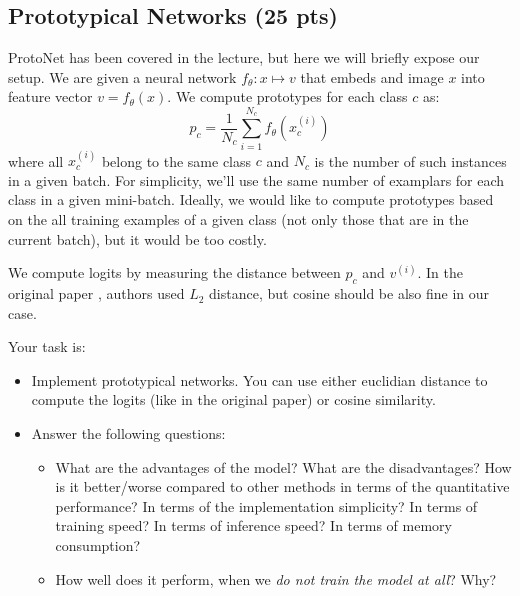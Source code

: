 \documentclass[letterpaper,12pt]{article}
\begin{document}
\subsection{Prototypical Networks (25 pts)}
ProtoNet has been covered in the lecture, but here we will briefly expose our setup.
We are given a neural network $f_\theta : x \mapsto v$ that embeds and image $x$ into feature vector $v = f_\theta(x)$.
We compute prototypes for each class $c$ as:
\begin{equation}
    p_c = \frac{1}{N_c} \sum_{i=1}^{N_c} f_\theta(x^{(i)}_c)
\end{equation}
where all $x^{(i)}_c$ belong to the same class $c$ and $N_c$ is the number of such instances in a given batch.
For simplicity, we'll use the same number of examplars for each class in a given mini-batch.
Ideally, we would like to compute prototypes based on the all training examples of a given class (not only those that are in the current batch), but it would be too costly.

We compute logits by measuring the distance between $p_c$ and $v^{(i)}$.
In the original paper \cite{ProtoNet}, authors used $L_2$ distance, but cosine should be also fine in our case.

Your task is:
\begin{itemize}
    \item Implement prototypical networks. You can use either euclidian distance to compute the logits (like in the original paper) or cosine similarity.
    \item Answer the following questions:
    \begin{itemize}
        \item What are the advantages of the model? What are the disadvantages? How is it better/worse compared to other methods in terms of the quantitative performance? In terms of the implementation simplicity? In terms of training speed? In terms of inference speed? In terms of memory consumption?
        \item How well does it perform, when we \textit{do not train the model at all}? Why?
    \end{itemize}
\end{itemize}
\end{document}
